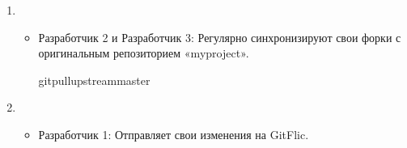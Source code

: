 \documentclass[letterpaper,10pt,russian]{sphinxmanual}
\begin{document}
\begin{enumerate}
\begin{itemize}
\begin{sphinxVerbatim}[commandchars=\\\{\}]
gitadd.
gitcommit\PYGZhy{}m
\end{sphinxVerbatim}

\item {} 
\sphinxAtStartPar
Разработчик 2: Работает над второй задачей и вносит изменения в свой локальный репозиторий.

\begin{sphinxVerbatim}[commandchars=\\\{\}]
gitadd.
gitcommit\PYGZhy{}m
\end{sphinxVerbatim}

\item {} 
\sphinxAtStartPar
Разработчик 3: Работает над третьей задачей и вносит изменения в свой локальный репозиторий.

\begin{sphinxVerbatim}[commandchars=\\\{\}]
gitadd.
gitcommit\PYGZhy{}m
\end{sphinxVerbatim}

\end{itemize}

\item {} 
\sphinxAtStartPar
{}
\begin{itemize}
\item {} 
\sphinxAtStartPar
Разработчик 2 и Разработчик 3: Регулярно синхронизируют свои форки с оригинальным репозиторием «myproject».

\begin{sphinxVerbatim}[commandchars=\\\{\}]
gitpullupstreammaster
\end{sphinxVerbatim}

\end{itemize}

\item {} 
\sphinxAtStartPar
{}
\begin{itemize}
\item {} 
\sphinxAtStartPar
Разработчик 1: Отправляет свои изменения на GitFlic.


\end{itemize}
\end{enumerate}
\end{document}

